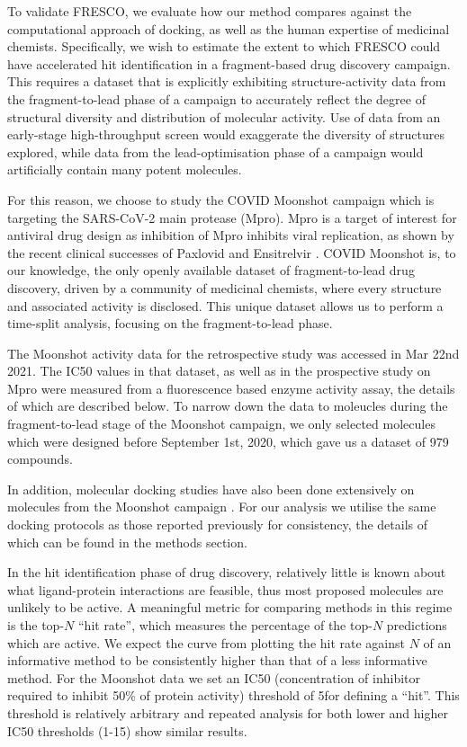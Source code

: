 To validate FRESCO, we evaluate how our method compares against the computational approach of docking, as well as the human expertise of medicinal chemists. Specifically, we wish to estimate the extent to which FRESCO could have accelerated hit identification in a fragment-based drug discovery campaign. This requires a dataset that is explicitly exhibiting structure-activity data from the fragment-to-lead phase of a campaign to accurately reflect the degree of structural diversity and distribution of molecular activity. Use of data from an early-stage high-throughput screen would exaggerate the diversity of structures explored, while data from the lead-optimisation phase of a campaign would artificially contain many potent molecules.

For this reason, we choose to study the COVID Moonshot campaign \cite{Moonshot2022} which is targeting the SARS-CoV-2 main protease (Mpro). Mpro is a target of interest for antiviral drug design as inhibition of Mpro inhibits viral replication, as shown by the recent clinical successes of Paxlovid and Ensitrelvir \cite{Dafydd2021Paxlovid,unoh2022discovery}. COVID Moonshot is, to our knowledge, the only openly available dataset of fragment-to-lead drug discovery, driven by a community of medicinal chemists, where every structure and associated activity is disclosed. This unique dataset allows us to perform a time-split analysis, focusing on the fragment-to-lead phase.

The Moonshot activity data for the retrospective study was accessed in Mar 22nd 2021. The IC50 values in that dataset, as well as in the prospective study on Mpro were measured from a fluorescence based enzyme activity assay, the details of which are described below. To narrow down the data to moleucles during the fragment-to-lead stage of the Moonshot campaign, we only selected molecules which were designed before September 1st, 2020, which gave us a dataset of 979 compounds.

In addition, molecular docking studies have also been done extensively on molecules from the Moonshot campaign \cite{Morris2021Rank, Saar2021biorxiv}. For our analysis we utilise the same docking protocols as those reported previously for consistency, the details of which can be found in the methods section.

In the hit identification phase of drug discovery, relatively little is known about what ligand-protein interactions are feasible, thus most proposed molecules are unlikely to be active. A meaningful metric for comparing methods in this regime is the top-$N$ ``hit rate'', which measures the percentage of the top-$N$ predictions which are active. We expect the curve from plotting the hit rate against $N$ of an informative method to be consistently higher than that of a less informative method. For the Moonshot data we set an IC50 (concentration of inhibitor required to inhibit 50\% of protein activity) threshold of 5\uM for defining a ``hit''. This threshold is relatively arbitrary and repeated analysis for both lower and higher IC50 thresholds (1-15\uM) show similar results.

